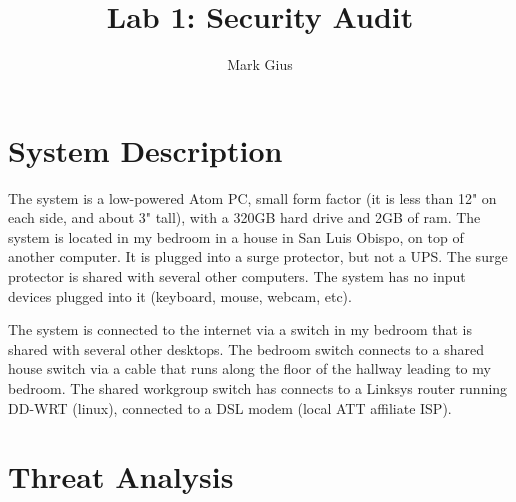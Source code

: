 \documentclass[11pt]{article}
\begin{document}
%
\author{Mark Gius}
\title{Lab 1: Security Audit}
\maketitle

\section{System Description}

The system is a low-powered Atom PC, small form factor 
(it is less than 12" on each side, and about 3" tall), 
with a 320GB hard drive and 2GB of ram.  
The system is located in my bedroom in a house in San Luis Obispo, 
on top of another computer.  It is plugged into a surge protector, 
but not a UPS.  The surge protector is shared with several other computers.
The system has no input devices plugged into it 
(keyboard, mouse, webcam, etc).

The system is connected to the internet via a switch in my bedroom 
that is shared with several other desktops. The bedroom switch connects 
to a shared house switch via a cable that runs along the floor of 
the hallway leading to my bedroom.  The shared workgroup switch 
has connects to a Linksys router running DD-WRT (linux), connected to 
a DSL modem (local ATT affiliate ISP).

\section{Threat Analysis}
\end{document}

